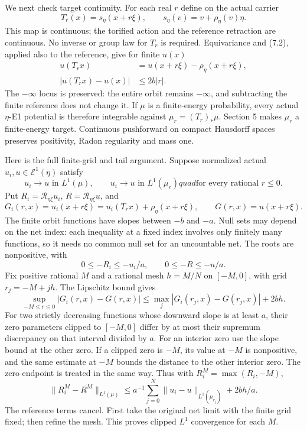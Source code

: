 \documentclass[
  10pt,
]{article}
\begin{document}
We next check target continuity. For each real \(r\) define on the
actual carrier \[
 T_r(x)=s_\eta(x+r\xi),\qquad
       s_\eta(v)=v+\rho_\eta(v)\eta.                            \tag{7.5}
\] This map is continuous; the torified action and the reference
retraction are continuous. No inverse or group law for \(T_r\) is
required. Equivariance and (7.2), applied also to the reference, give
for finite \(u(x)\) \[
 \begin{split}
 u(T_rx)&=u(x+r\xi)-\rho_\eta(x+r\xi),\\
                         |u(T_rx)-u(x)|&\leq2b|r|.
 \end{split}                                                   \tag{7.6}
\] The \(-\infty\) locus is preserved: the entire orbit remains
\(-\infty\), and subtracting the finite reference does not change it. If
\(\mu\) is a finite-energy probability, every actual \(\eta\)-E1
potential is therefore integrable against \(\mu_r=(T_r)_*\mu\). Section
5 makes \(\mu_r\) a finite-energy target. Continuous pushforward on
compact Hausdorff spaces preserves positivity, Radon regularity and mass
one.

Here is the full finite-grid and tail argument. Suppose normalized
actual \(u_i,u\in\mathcal E^1(\eta)\) satisfy \[
 u_i\to u\text{ in }L^1(\mu),\qquad
 u_i\to u\text{ in }L^1(\mu_r)quad\text{for every rational }r\leq0.
                                                               \tag{7.7}
\] Put \(R_i=\mathcal R_{\eta\xi}u_i\), \(R=\mathcal R_{\eta\xi}u\), and
\[
 G_i(r,x)=u_i(x+r\xi)=u_i(T_rx)+\rho_\eta(x+r\xi),\qquad
 G(r,x)=u(x+r\xi).
\] The finite orbit functions have slopes between \(-b\) and \(-a\).
Null sets may depend on the net index: each inequality at a fixed index
involves only finitely many functions, so it needs no common null set
for an uncountable net. The roots are nonpositive, with \[
                    0\leq-R_i\leq-u_i/a,\qquad0\leq-R\leq-u/a. \tag{7.8}
\] Fix positive rational \(M\) and a rational mesh \(h=M/N\) on
\([-M,0]\), with grid \(r_j=-M+jh\). The Lipschitz bound gives \[
 \sup_{-M\leq r\leq0}|G_i(r,x)-G(r,x)|
             \leq\max_j|G_i(r_j,x)-G(r_j,x)|+2bh.
\] For two strictly decreasing functions whose downward slope is at
least \(a\), their zero parameters clipped to \([-M,0]\) differ by at
most their supremum discrepancy on that interval divided by \(a\). For
an interior zero use the slope bound at the other zero. If a clipped
zero is \(-M\), its value at \(-M\) is nonpositive, and the same
estimate at \(-M\) bounds the distance to the other interior zero. The
zero endpoint is treated in the same way. Thus with
\(R_i^M=\max(R_i,-M)\), \[
 \|R_i^M-R^M\|_{L^1(\mu)}
 \leq a^{-1}\sum_{j=0}^N\|u_i-u\|_{L^1(\mu_{r_j})}+2bh/a.       \tag{7.9}
\] The reference terms cancel. First take the original net limit with
the finite grid fixed; then refine the mesh. This proves clipped \(L^1\)
convergence for each \(M\).
\end{document}
